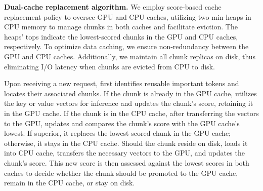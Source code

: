 \noindent \textbf{Dual-cache replacement algorithm.}
We employ score-based cache replacement policy to oversee GPU and CPU caches, utilizing two min-heaps in CPU memory to manage chunks in both caches and facilitate eviction. The heaps' tops indicate the lowest-scored chunks in the GPU and CPU caches, respectively. To optimize data caching, we ensure non-redundancy between the GPU and CPU caches. Additionally, we maintain all chunk replicas on disk, thus eliminating I/O latency when chunks are evicted from CPU to disk.

Upon receiving a new request, \pname{} first identifies reusable important tokens and locates their associated chunks. If the chunk is already in the GPU cache, \pname{} utilizes the key or value vectors for inference and updates the chunk's score, retaining it in the GPU cache. If the chunk is in the CPU cache, after transferring the vectors to the GPU, \pname{} updates and compares the chunk's score with the GPU cache's lowest. If superior, it replaces the lowest-scored chunk in the GPU cache; otherwise, it stays in the CPU cache.
Should the chunk reside on disk, \pname{} loads it into CPU cache, transfers the necessary vectors to the GPU, and updates the chunk's score. This new score is then assessed against the lowest scores in both caches to decide whether the chunk should be promoted to the GPU cache, remain in the CPU cache, or stay on disk.



